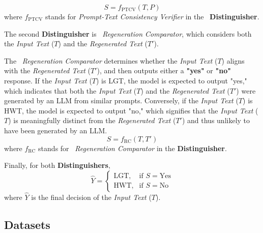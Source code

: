 \[
S = f_{\text{PTCV}}(T, P)
\]  
where \( f_{\text{PTCV}} \) stands for \textit{Prompt-Text Consistency Verifier} in the ~\textbf{Distinguisher}.

The second \textbf{Distinguisher} is ~\textit{Regeneration Comparator}, which considers both the \textit{Input Text} (\( T \)) and the \textit{Regenerated Text} (\( T' \)).

The ~\textit{Regeneration Comparator} determines whether the \textit{Input Text} (\( T \)) aligns with the \textit{Regenerated Text} (\( T' \)), and then outputs either a \textbf{"yes"} or \textbf{"no"} response. If the \textit{Input Text} (\( T \)) is LGT, the model is expected to output "yes," which indicates that both the \textit{Input Text} (\( T \)) and the \textit{Regenerated Text} (\( T' \)) were generated by an LLM from similar prompts. Conversely, if the \textit{Input Text} (\( T \)) is HWT, the model is expected to output "no," which signifies that the \textit{Input Text}  (\( T \)) is meaningfully distinct from the \textit{Regenerated Text} (\( T' \)) and thus unlikely to have been generated by an LLM.
\[
S = f_{\text{RC}}(T, T')
\]  
where \( f_{\text{RC}} \) stands for ~\textit{Regeneration Comparator} in the \textbf{Distinguisher}.

Finally, for both \textbf{Distinguishers},
\[
\hat{Y} = 
\begin{cases} 
\text{LGT}, & \text{if } S = \text{Yes} \\ 
\text{HWT}, & \text{if } S = \text{No} 
\end{cases}
\]  
where \( \hat{Y} \) is the final decision of the \textit{Input Text} (\( T \)).



\subsection{Datasets}
